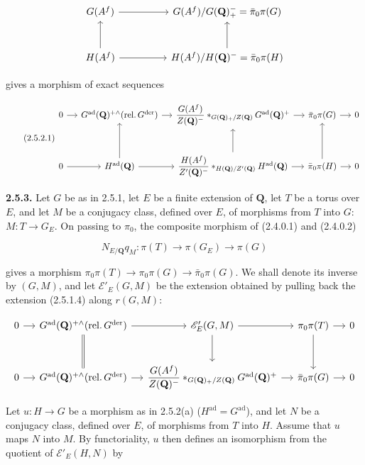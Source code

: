 \documentclass[10pt,a4paper]{article}
\begin{document}
\[
\begin{tikzcd}[column sep=huge,row sep=large]
G(A^f) \arrow[r] & G(A^f)/G(\mathbf Q)_+^{-}=\bar\pi_0\pi(G) \\
H(A^f) \arrow[r] \arrow[u] & H(A^f)/H(\mathbf Q)^{-}=\bar\pi_0\pi(H) \arrow[u]
\end{tikzcd}
\]

gives a morphism of exact sequences

\[
\tag{2.5.2.1}
\begin{tikzcd}[column sep=small,row sep=large]
0 \arrow[r] & G^{\mathrm{ad}}(\mathbf Q)^{+\wedge}(\mathrm{rel.}\,G^{\mathrm{der}}) \arrow[r] & \dfrac{G(A^f)}{Z(\mathbf Q)^{-}}*_{G(\mathbf Q)_+/Z(\mathbf Q)}G^{\mathrm{ad}}(\mathbf Q)^+ \arrow[r] & \bar\pi_0\pi(G) \arrow[r] & 0 \\
0 \arrow[r] & H^{\mathrm{ad}}(\mathbf Q) \arrow[r] \arrow[u] & \dfrac{H(A^f)}{Z'(\mathbf Q)^{-}}*_{H(\mathbf Q)/Z'(\mathbf Q)}H^{\mathrm{ad}}(\mathbf Q) \arrow[r] \arrow[u] & \bar\pi_0\pi(H) \arrow[r] \arrow[u] & 0
\end{tikzcd}
\]

\textbf{2.5.3.} Let \(G\) be as in 2.5.1, let \(E\) be a finite extension of \(\mathbf Q\), let \(T\) be a torus over \(E\), and let \(M\) be a conjugacy class, defined over \(E\), of morphisms from \(T\) into \(G\): \(M:T\to G_E\). On passing to \(\pi_0\), the composite morphism of (2.4.0.1) and (2.4.0.2)

\[
N_{E/\mathbf Q}q_M:\pi(T)\longrightarrow\pi(G_E)\longrightarrow\pi(G)
\]

gives a morphism \(\pi_0\pi(T)\to\pi_0\pi(G)\to\bar\pi_0\pi(G)\). We shall denote its inverse by \((G,M)\), and let \(\mathscr E'_E(G,M)\) be the extension obtained by pulling back the extension (2.5.1.4) along \(r(G,M)\):

\[
\begin{tikzcd}[column sep=small,row sep=large]
0 \arrow[r] & G^{\mathrm{ad}}(\mathbf Q)^{+\wedge}(\mathrm{rel.}\,G^{\mathrm{der}}) \arrow[r] \arrow[d,equal] & \mathscr E'_E(G,M) \arrow[r] \arrow[d] & \pi_0\pi(T) \arrow[r] \arrow[d] & 0 \\
0 \arrow[r] & G^{\mathrm{ad}}(\mathbf Q)^{+\wedge}(\mathrm{rel.}\,G^{\mathrm{der}}) \arrow[r] & \dfrac{G(A^f)}{Z(\mathbf Q)^{-}}*_{G(\mathbf Q)_+/Z(\mathbf Q)}G^{\mathrm{ad}}(\mathbf Q)^+ \arrow[r] & \bar\pi_0\pi(G) \arrow[r] & 0
\end{tikzcd}
\]

Let \(u:H\to G\) be a morphism as in 2.5.2(a) (\(H^{\mathrm{ad}}=G^{\mathrm{ad}}\)), and let \(N\) be a conjugacy class, defined over \(E\), of morphisms from \(T\) into \(H\). Assume that \(u\) maps \(N\) into \(M\). By functoriality, \(u\) then defines an isomorphism from the quotient of \(\mathscr E'_E(H,N)\) by
\end{document}

